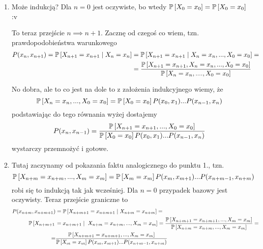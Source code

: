 \begin{solution}
  \begin{enumerate}
    \item Może indukcją? Dla $n=0$ jest oczywiste, bo wtedy $\prob{X_0=x_0}=\prob{X_0=x_0}$ :v

      To teraz przejście $n\implies n+1$. Zacznę od czegoś co wiem, tzn. prawdopodobieństwa warunkowego
      \begin{align*}
        P(x_n, x_{n+1})=\prob{X_{n+1}=x_{n+1}}{X_n=x_n}&=\prob{X_{n+1}=x_{n+1}}{X_n=x_n,...,X_0=x_0}=\\ 
                                                       &=\frac{\prob{X_{n+1}=x_{n+1}, X_n=x_n,...,X_0=x_0}}{\prob{X_n=x_n,....,X_0=x_0}}
      \end{align*}

      No dobra, ale to co jest na dole to z założenia indukcyjnego wiemy, że 
      $$\prob{X_n=x_n,...,X_0=x_0}=\prob{X_0=x_0}P(x_0, x_1)...P(x_{n-1},x_n)$$
      podstawiając do tego równania wyżej dostajemy
      $$P(x_n,x_{n-1})=\frac{\prob{X_{n+1}=x_{n+1},...,X_0=x_0}}{\prob{X_0=x_0}P(x_0,x_1)...P(x_{n-1},x_n)}$$
      wystarczy przemnożyć i gotowe.
    \item Tutaj zaczynamy od pokazania faktu analogicznego do punktu 1., tzn. 
      $$\prob{X_{n+m}=x_{n+m},..., X_m=x_m}=\prob{X_m=x_m}P(x_m, x_{m+1})...P(x_{n+m-1}, x_{n+m})$$
      robi się to indukcją tak jak wcześniej. Dla $n=0$ przypadek bazowy jest oczywisty. Teraz przejście graniczne to
      \begin{align*}
        P(x_{n+m}, x_{n+m+1})&=\prob{X_{n+m+1}=x_{n+m+1}}{X_{n+m}=x_{n+m}}=\\
        \mathbb{P}\left[X_{n+m+1}\right.&=x_{n+m+1}\;|\;\left.X_{n+m}=x_{n+m},..., X_m=x_m\right]=\frac{\prob{X_{n+m+1}=x_{n+m+1},..., X_m=x_m}}{\prob{X_{n+m}=x_{n+m},..., X_m=x_m}}=\\ 
        =&\frac{\prob{X_{n+m+1}=x_{n+m+1},..., X_m=x_m}}{\prob{X_m=x_m}P(x_{m}, x_{m+1})...P(x_{n+m-1},x_{n+m})}
      \end{align*}


\end{enumerate}
\end{solution}
